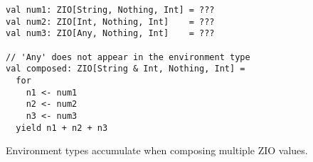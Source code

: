 \begin{algorithm}

\begin{verbatim}
val num1: ZIO[String, Nothing, Int] = ???
val num2: ZIO[Int, Nothing, Int]    = ???
val num3: ZIO[Any, Nothing, Int]    = ???

// 'Any' does not appear in the environment type
val composed: ZIO[String & Int, Nothing, Int] =
  for
    n1 <- num1
    n2 <- num2
    n3 <- num3
  yield n1 + n2 + n3
\end{verbatim}

\caption{Environment types accumulate when composing multiple ZIO values. \label{zio:environment-accumulation}}
\end{algorithm}